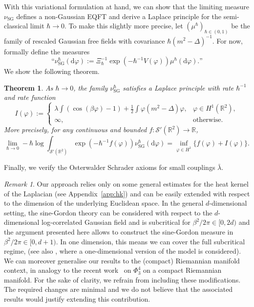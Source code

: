\documentclass[11pt, a4paper]{scrartcl}
\numberwithin{equation}{section}
\theoremstyle{plain}
\newtheorem{theorem}[foo]{Theorem}
\theoremstyle{remark}
\newtheorem{remark}[foo]{Remark}
\newcommand{\assign}{:=}
\newcommand{\mathd}{\mathrm{d}}
\newcommand{\tmop}[1]{\ensuremath{\operatorname{#1}}}
\begin{document}
With this variational formulation at hand, we can show that the
limiting measure $\nu_{\tmop{SG}}$ defines a non-Gaussian EQFT and derive a
Laplace principle for the semi-classical limit $\hbar \rightarrow 0$. To make
this slightly more precise, let $(\mu^{\hbar})_{\hbar \in (0, 1)}$ be the
family of rescaled Gaussian free fields with covariance $\hbar (m^2 -
	\Delta)^{- 1}$. For now, formally define the measures
\[ \text{``} \nu_{\tmop{SG}}^{\hbar} (\mathd \varphi) \assign \Xi_{\hbar}^{-
		1} \exp (- \hbar^{- 1} V (\varphi)) \mu^{\hbar} (\mathd \varphi) \text{.''}
\]
We show the following theorem.

\begin{theorem}
	\label{thm:LDP}As $\hbar \rightarrow 0$, the family
	$\nu^{\hbar}_{\tmop{SG}}$ satisfies a Laplace principle with rate $\hbar^{-
			1}$ and rate function
	\begin{equation}
		I (\varphi) \assign \begin{cases}
			\lambda \int (\cos (\beta \varphi) - 1) + \frac{1}{2} \int \varphi (m^2
			- \Delta) \varphi, & \varphi \in H^1 (\mathbb{R}^2), \\
			\infty,            & \text{otherwise} .
		\end{cases} \label{eq:def-rf}
	\end{equation}
	More precisely, for any continuous and bounded $f : \mathcal{S} '
		(\mathbb{R}^2) \rightarrow \mathbb{R}$,
	\begin{equation}
		\lim_{\hbar \rightarrow 0} - \hbar \log \int_{\mathcal{S}' (\mathbb{R}^2)}
		\exp (- \hbar^{- 1} f (\varphi)) \nu_{\tmop{SG}}^{\hbar} (\mathd \varphi)
		= \inf_{\varphi \in H^1} \{ f (\varphi) + I (\varphi) \} . \label{eq:LDP}
	\end{equation}
\end{theorem}

Finally, we verify the
Osterwalder Schrader axioms for small couplings $\bar{\lambda}$.

\begin{remark}
	Our approach relies only on some general estimates for the heat kernel of
	the Laplacian (see Appendix~\ref{app:hk}) and can be easily extended with
	respect to the dimension of the underlying Euclidean space. In the general
	$d$-dimensional setting, the sine-Gordon theory can be considered with respect to the $d$-dimensional log-correlated Gaussian field and is subcritical for $\beta^2 / 2 \pi \in
		[0, 2 d)$ and the argument presented here allows to construct the
	sine-Gordon measure in $\beta^2 / 2 \pi \in [0, d + 1)$. In one dimension, this means we can cover the full subcritical
	regime, (see also
		{\cite{lacoinProbabilisticApproachUltraviolet2022}}, where a one-dimensional version of the model is considered). We can moreover generalise our results to the
	(compact) Riemannian manifold context, in analogy to the recent
	work~{\cite{bailleulPhi4_3MeasuresCompact2023}} on $\Phi^4_3$ on a compact
	Riemannian manifold. For the sake of clarity, we refrain from including
	these modifications. The required changes are minimal and we do not believe
	that the associated results would justify extending this contribution.
\end{remark}
\end{document}
